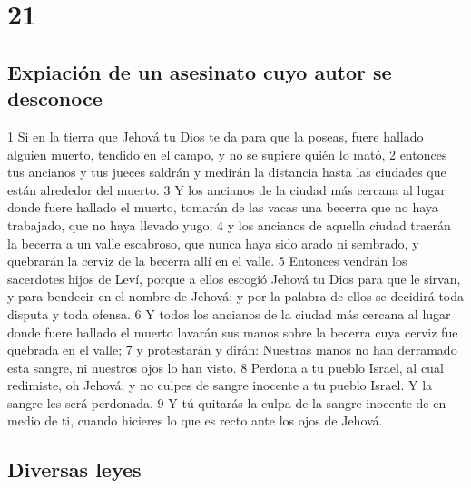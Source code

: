 \chapter{21}


\section{Expiación de un asesinato cuyo autor se desconoce}


1 Si en la tierra que Jehová tu Dios te da para que la poseas, fuere hallado alguien muerto, tendido en el campo, y no se supiere quién lo mató,
2 entonces tus ancianos y tus jueces saldrán y medirán la distancia hasta las ciudades que están alrededor del muerto.
3 Y los ancianos de la ciudad más cercana al lugar donde fuere hallado el muerto, tomarán de las vacas una becerra que no haya trabajado, que no haya llevado yugo;
4 y los ancianos de aquella ciudad traerán la becerra a un valle escabroso, que nunca haya sido arado ni sembrado, y quebrarán la cerviz de la becerra allí en el valle.
5 Entonces vendrán los sacerdotes hijos de Leví, porque a ellos escogió Jehová tu Dios para que le sirvan, y para bendecir en el nombre de Jehová; y por la palabra de ellos se decidirá toda disputa y toda ofensa.
6 Y todos los ancianos de la ciudad más cercana al lugar donde fuere hallado el muerto lavarán sus manos sobre la becerra cuya cerviz fue quebrada en el valle;
7 y protestarán y dirán: Nuestras manos no han derramado esta sangre, ni nuestros ojos lo han visto.
8 Perdona a tu pueblo Israel, al cual redimiste, oh Jehová; y no culpes de sangre inocente a tu pueblo Israel. Y la sangre les será perdonada.
9 Y tú quitarás la culpa de la sangre inocente de en medio de ti, cuando hicieres lo que es recto ante los ojos de Jehová.

\section{Diversas leyes}


